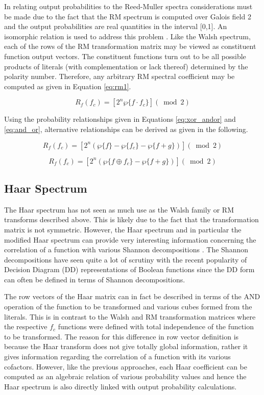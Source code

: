 In relating output probabilities to the Reed-Muller spectra considerations must
be made due to the fact that the RM spectrum is computed over Galois field 2 and
the output probabilities are real quantities in the interval [0,1].  An isomorphic
relation is used to address this problem \cite{TN95b}.  Like the
Walsh spectrum, each of the rows of the RM transformation matrix may be viewed as
constituent function output vectors.  The constituent functions turn out to be
all possible products of literals (with complementation or lack thereof) determined
by the polarity number.  Therefore, any arbitrary RM spectral coefficient may
be computed as given in Equation \ref{eq:rm1}.

\begin{equation}
R_f(f_c) = [2^n \wp \{f \cdot f_c \} ] (\bmod{2})   \label{eq:rm1}
\end{equation}

Using the probability relationships given in Equations \ref{eq:xor_andor} and 
\ref{eq:and_or}, alternative relationships can be derived as given in the
following.

\begin{equation}
R_f(f_c) = [2^n (\wp \{f \} - \wp \{ f_c \} - \wp \{ f+g \} ) ] (\bmod{2}) \label{eq:rm2}
\end{equation}

\begin{equation}
R_f(f_c) = [2^n (\wp \{f \oplus f_c \} - \wp \{ f+g \} ) ] (\bmod{2}) \label{eq:rm3}
\end{equation}

\subsection{Haar Spectrum}
The Haar spectrum \cite{AR75} \cite{SH81} \cite{MK76} 
has not seen as much use as the Walsh family or RM transforms
described above.  This is likely due to the fact that the transformation matrix
is not symmetric. However, the Haar spectrum and
in particular the modified Haar spectrum can provide very interesting information
concerning the correlation of a function with various Shannon decompositions \cite{HMM85}.  The
Shannon decompositions have seen quite a lot of scrutiny with the recent popularity
of Decision Diagram (DD) representations of Boolean functions since the DD form can
often be defined in terms of Shannon decompositions.

The row vectors of the Haar matrix can in fact be described in terms of the AND
operation of the function to be transformed and various cubes formed from the 
literals.  This is in contrast to the Walsh and RM transformation matrices where the
respective $f_c$ functions were defined with total independence of the function to
be transformed.  The reason for this difference in row vector definition
is because the Haar transform
does not give totally global information, rather it gives information regarding
the correlation of a function with its various cofactors.  However, like the previous
approaches, each Haar coefficient can be computed as an algebraic relation of various
probability values and hence the Haar spectrum is also directly linked with output
probability calculations.

